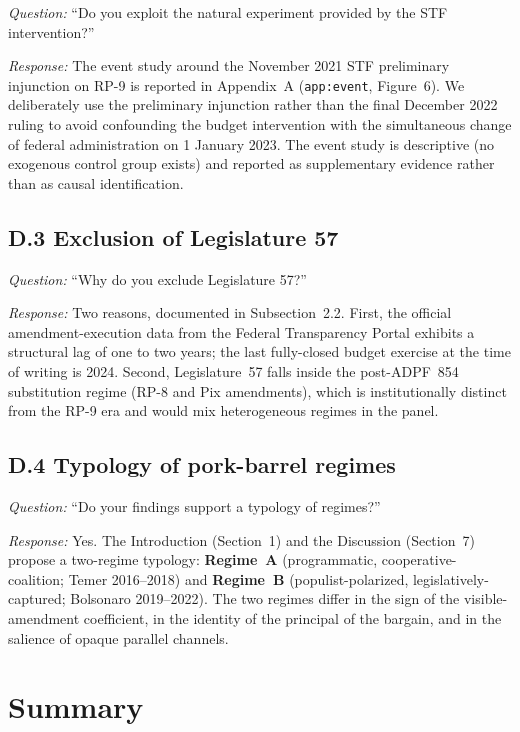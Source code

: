 \documentclass[11pt]{article}
\begin{document}
\noindent\emph{Question:} ``Do you exploit the natural experiment provided
by the STF intervention?''

\noindent\emph{Response:} The event study around the November 2021 STF
preliminary injunction on RP-9 is reported in Appendix~A
(\texttt{app:event}, Figure~6). We deliberately use the preliminary
injunction rather than the final December 2022 ruling to avoid
confounding the budget intervention with the simultaneous change of
federal administration on 1 January 2023. The event study is
descriptive (no exogenous control group exists) and reported as
supplementary evidence rather than as causal identification.

\subsection*{D.3 \quad Exclusion of Legislature 57}

\noindent\emph{Question:} ``Why do you exclude Legislature 57?''

\noindent\emph{Response:} Two reasons, documented in Subsection~2.2.
First, the official amendment-execution data from the Federal
Transparency Portal exhibits a structural lag of one to two years;
the last fully-closed budget exercise at the time of writing is
2024. Second, Legislature~57 falls inside the post-ADPF~854
substitution regime (RP-8 and Pix amendments), which is
institutionally distinct from the RP-9 era and would mix
heterogeneous regimes in the panel.

\subsection*{D.4 \quad Typology of pork-barrel regimes}

\noindent\emph{Question:} ``Do your findings support a typology of regimes?''

\noindent\emph{Response:} Yes. The Introduction (Section~1) and the
Discussion (Section~7) propose a two-regime typology:
\textbf{Regime~A} (programmatic, cooperative-coalition; Temer
2016--2018) and \textbf{Regime~B} (populist-polarized,
legislatively-captured; Bolsonaro 2019--2022). The two regimes
differ in the sign of the visible-amendment coefficient, in the
identity of the principal of the bargain, and in the salience of
opaque parallel channels.

\section*{Summary}
\end{document}
